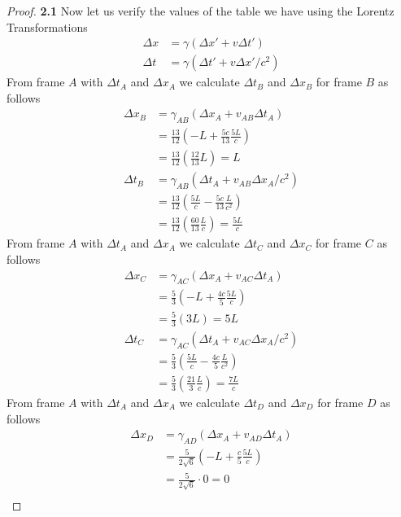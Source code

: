 \documentclass[11pt]{article}
\theoremstyle{definition}
\begin{document}
\begin{proof}{\textbf{2.1}}
        Now let us verify the values of the table we have using the Lorentz
        Transformations
        \begin{align*}
            \Delta x &= \gamma (\Delta x' + v\Delta t')\\
            \Delta t &= \gamma (\Delta t' + v\Delta x'/c^2)
        \end{align*}
        From frame $A$ with $\Delta t_A$ and $\Delta x_A$ we calculate $\Delta t_B$ and
        $\Delta x_B$ for frame $B$ as follows
        \begin{align*}
            \Delta x_B &= \gamma_{AB}(\Delta x_A + v_{AB}\Delta t_A)\\
                &= \frac{13}{12}(-L + \frac{5c}{13}\frac{5L}{c}) \\
                &= \frac{13}{12}(\frac{12}{13}L) = L \\
            \Delta t_B &= \gamma_{AB} (\Delta t_A + v_{AB}\Delta x_A/c^2)\\
                &= \frac{13}{12}(\frac{5L}{c} - \frac{5c}{13}\frac{L}{c^2}) \\
                &= \frac{13}{12}(\frac{60}{13}\frac{L}{c}) = \frac{5L}{c}
        \end{align*}
\cleardoublepage
        From frame $A$ with $\Delta t_A$ and $\Delta x_A$ we calculate $\Delta t_C$ and
        $\Delta x_C$ for frame $C$ as follows
        \begin{align*}
            \Delta x_C &= \gamma_{AC}(\Delta x_A + v_{AC}\Delta t_A)\\
                &= \frac{5}{3}(-L + \frac{4c}{5}\frac{5L}{c}) \\
                &= \frac{5}{3}(3L) = 5L \\
            \Delta t_C &= \gamma_{AC} (\Delta t_A + v_{AC}\Delta x_A/c^2)\\
                &= \frac{5}{3}(\frac{5L}{c} - \frac{4c}{5}\frac{L}{c^2}) \\
                &= \frac{5}{3}(\frac{21}{3}\frac{L}{c}) = \frac{7L}{c}
        \end{align*}
        From frame $A$ with $\Delta t_A$ and $\Delta x_A$ we calculate $\Delta t_D$ and
        $\Delta x_D$ for frame $D$ as follows
        \begin{align*}
            \Delta x_D &= \gamma_{AD}(\Delta x_A + v_{AD}\Delta t_A)\\
                &= \frac{5}{2\sqrt{6}}(-L + \frac{c}{5}\frac{5L}{c}) \\
                &= \frac{5}{2\sqrt{6}} \cdot 0 = 0 \\

\end{align*}
\end{proof}
\end{document}
